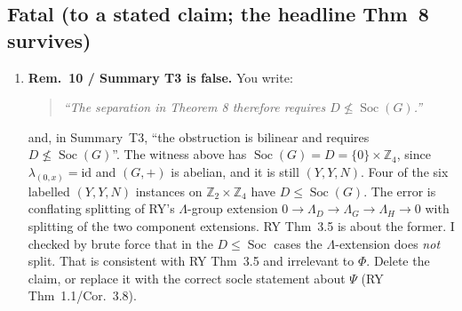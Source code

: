 \documentclass[11pt]{article}
\newcommand{\Z}{\mathbb{Z}}
\newcommand{\Soc}{\operatorname{Soc}}
\newenvironment{quoted}{\begin{quote}\small\itshape}{\end{quote}}
\begin{document}
\subsection*{Fatal (to a stated claim; the headline Thm~8 survives)}
\begin{enumerate}[leftmargin=*]
\item \textbf{Rem.~10 / Summary T3 is false.} You write:
  \begin{quoted}``The separation in Theorem 8 therefore requires $D\not\le\Soc(G)$.''\end{quoted}
  and, in Summary~T3, ``the obstruction is bilinear and requires $D\not\le\Soc(G)$''. The
  witness above has $\Soc(G)=D=\{0\}\times\Z_4$, since $\lambda_{(0,x)}=\mathrm{id}$ and
  $(G,+)$ is abelian, and it is still $(Y,Y,N)$. Four of the six labelled $(Y,Y,N)$
  instances on $\Z_2\times\Z_4$ have $D\le\Soc(G)$. The error is conflating splitting of
  RY's $\Lambda$-group extension $0\to\Lambda_D\to\Lambda_G\to\Lambda_H\to0$ with splitting
  of the two component extensions. RY Thm~3.5 is about the former. I checked by brute force
  that in the $D\le\Soc$ cases the $\Lambda$-extension does \emph{not} split. That is
  consistent with RY Thm~3.5 and irrelevant to $\Phi$. Delete the claim, or replace it
  with the correct socle statement about $\Psi$ (RY Thm~1.1/Cor.~3.8).
\end{enumerate}
\end{document}
